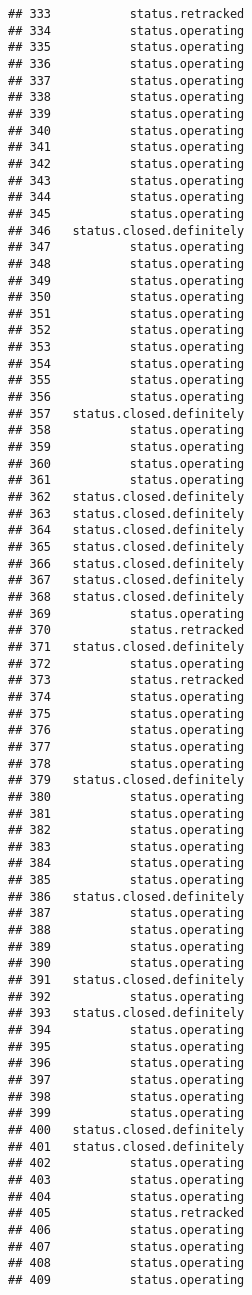 \documentclass[
]{article}
\begin{document}
\begin{verbatim}
## 333           status.retracked
## 334           status.operating
## 335           status.operating
## 336           status.operating
## 337           status.operating
## 338           status.operating
## 339           status.operating
## 340           status.operating
## 341           status.operating
## 342           status.operating
## 343           status.operating
## 344           status.operating
## 345           status.operating
## 346   status.closed.definitely
## 347           status.operating
## 348           status.operating
## 349           status.operating
## 350           status.operating
## 351           status.operating
## 352           status.operating
## 353           status.operating
## 354           status.operating
## 355           status.operating
## 356           status.operating
## 357   status.closed.definitely
## 358           status.operating
## 359           status.operating
## 360           status.operating
## 361           status.operating
## 362   status.closed.definitely
## 363   status.closed.definitely
## 364   status.closed.definitely
## 365   status.closed.definitely
## 366   status.closed.definitely
## 367   status.closed.definitely
## 368   status.closed.definitely
## 369           status.operating
## 370           status.retracked
## 371   status.closed.definitely
## 372           status.operating
## 373           status.retracked
## 374           status.operating
## 375           status.operating
## 376           status.operating
## 377           status.operating
## 378           status.operating
## 379   status.closed.definitely
## 380           status.operating
## 381           status.operating
## 382           status.operating
## 383           status.operating
## 384           status.operating
## 385           status.operating
## 386   status.closed.definitely
## 387           status.operating
## 388           status.operating
## 389           status.operating
## 390           status.operating
## 391   status.closed.definitely
## 392           status.operating
## 393   status.closed.definitely
## 394           status.operating
## 395           status.operating
## 396           status.operating
## 397           status.operating
## 398           status.operating
## 399           status.operating
## 400   status.closed.definitely
## 401   status.closed.definitely
## 402           status.operating
## 403           status.operating
## 404           status.operating
## 405           status.retracked
## 406           status.operating
## 407           status.operating
## 408           status.operating
## 409           status.operating

\end{verbatim}
\end{document}
